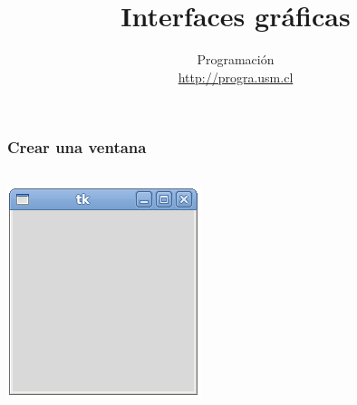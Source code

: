 \documentclass[12pt]{beamer}
\title{Interfaces gráficas}
\author{Programación \\ \url{http://progra.usm.cl}}
\date{}
\begin{document}
  \begin{frame}
    \maketitle
  \end{frame}

  \begin{frame}
    \label{crear-ventana}
    \frametitle{Crear una ventana}
    \begin{columns}[B]
        \LARGE
        
        \vspace{10ex}
        \vspace{10ex}
        \includegraphics[width=\textwidth]{programas/tkinter/capturas/01.png}
    \end{columns}
  \end{frame}
\end{document}
